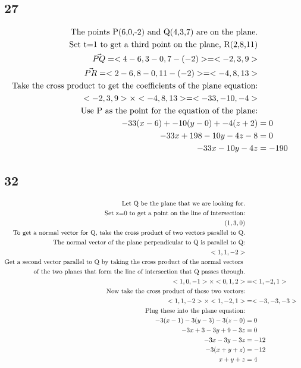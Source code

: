 \documentclass{article}%
\begin{document}
%
\subsection*{27}%
\begin{alignat*}{2}%
\textnormal{The points P(6,0,-2) and Q(4,3,7) are on the plane.}\\%
\textnormal{Set t=1 to get a third point on the plane, R(2,8,11)}\\%
\vec{PQ} = <4-6,3-0,7-(-2)> = <-2,3,9>\\%
\vec{PR} = <2-6,8-0,11-(-2)> = <-4,8,13>\\%
\textnormal{Take the cross product to get the coefficients of the plane equation:}\\%
<-2,3,9> \times <-4,8,13> = <-33,-10,-4>\\%
\textnormal{Use P as the point for the equation of the plane:}\\%
-33(x-6)+-10(y-0)+-4(z+2) &= 0\\%
-33x+198-10y-4z-8 &= 0\\%
-33x-10y-4z &= -190%
\end{alignat*}

%
\subsection*{32}%
\begin{alignat*}{2}%
\textnormal{Let Q be the plane that we are looking for.}\\%
\textnormal{Set z=0 to get a point on the line of intersection:}\\%
(1,3,0)\\%
\textnormal{To get a normal vector for Q, take the cross product of two vectors parallel to Q.}\\%
\textnormal{The normal vector of the plane perpendicular to Q is parallel to Q:}\\%
<1,1,-2>\\%
\textnormal{Get a second vector parallel to Q by taking the cross product of the normal vectors }\\%
\textnormal{of the two planes that form the line of intersection that Q passes through.}\\%
<1,0,-1> \times <0,1,2> &= <1,-2,1>\\%
\textnormal{Now take the cross product of these two vectors:}\\%
<1,1,-2> \times <1,-2,1> &= <-3,-3,-3>\\%
\textnormal{Plug these into the plane equation:}\\%
-3(x-1)-3(y-3)-3(z-0) &= 0\\%
-3x+3-3y+9-3z &= 0\\%
-3x-3y-3z &= -12\\%
-3(x+y+z) &= -12\\%
x+y+z &= 4\\%
\end{alignat*}
\end{document}

